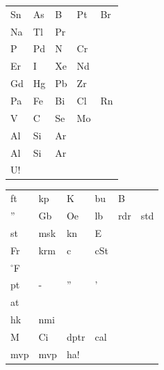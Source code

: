 \documentclass[a6paper, 10pt, twoside]{article}
\begin{document}
\begin{center}
\end{center}
\vspace{-10pt}
\begin{lyrics}
\begin{table}[!h]
\begin{tabularx}{0.8\textwidth}{X X X X X}
 Sn&As&B&Pt&Br
\vspace{2pt} \\
 Na & Tl & Pr 
\vspace{2pt} \\
  P & Pd & N & Cr
\vspace{2pt} \\
Er & I & Xe & Nd
\vspace{2pt} \\
Gd&Hg&Pb&Zr
\vspace{2pt} \\
Pa&Fe&Bi&Cl&Rn
\vspace{2pt} \\
V&C&Se&Mo
\vspace{2pt} \\
Al &Si&Ar
\vspace{2pt} \\
Al &Si&Ar
\vspace{2pt} \\
U!
\end{tabularx}
\end{table}
\end{lyrics}
\vspace{-10pt}
\begin{center}
\end{center}
\vspace{-10pt}
\begin{lyrics}
\begin{table}[!h]
\begin{tabularx}{0.8\textwidth}{X X X X X X}
 ft&kp&K&bu&B
\vspace{2pt} \\
 '' &Gb & Oe & lb&rdr&std 
\vspace{2pt} \\
st&msk&kn&E
\vspace{2pt} \\
Fr&krm&c&cSt
\vspace{2pt} \\
$^{\circ}$F
\vspace{2pt} \\
pt&-&''&'
\vspace{2pt} \\
at
\vspace{2pt} \\
hk&nmi \\
M&Ci&dptr&cal
\vspace{2pt} \\
mvp & mvp & ha!
\end{tabularx}
\end{table}
\end{lyrics}
\vspace{-10pt}
\end{document}
